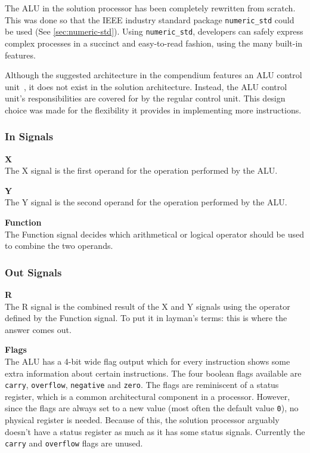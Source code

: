 The ALU in the solution processor has been completely rewritten from scratch.
This was done so that the IEEE industry standard package \texttt{numeric\_std} could be used (See \vref{sec:numeric-std}).
Using \texttt{numeric\_std}, developers can safely express complex processes in a succinct and easy-to-read fashion, using the many built-in features.

Although the suggested architecture in the compendium features an ALU control unit~\cite[p.115]{compendium}, it does not exist in the solution architecture.
Instead, the ALU control unit's responsibilities are covered for by the regular control unit.
This design choice was made for the flexibility it provides in implementing more instructions.

\subsubsection{In Signals}

\begin{description}
\item{\textbf{X}} \\
The X signal is the first operand for the operation performed by the ALU.

\item{\textbf{Y}} \\
The Y signal is the second operand for the operation performed by the ALU.

\item{\textbf{Function}} \\
The Function signal decides which arithmetical or logical operator should be used to combine the two operands.
\end{description}

\subsubsection{Out Signals}

\begin{description}
\item{\textbf{R}} \\
The R signal is the combined result of the X and Y signals using the operator defined by the Function signal.
To put it in layman's terms: this is where the answer comes out.

\item{\textbf{Flags}} \\
The ALU has a 4-bit wide flag output which for every instruction shows some extra information about certain instructions.
The four boolean flags available are \texttt{carry}, \texttt{overflow}, \texttt{negative} and \texttt{zero}.
The flags are reminiscent of a status register, which is a common architectural component in a processor.
However, since the flags are always set to a new value (most often the default value \texttt{0}), no physical register is needed.
Because of this, the solution processor arguably doesn't have a status register as much as it has some status signals.
Currently the \texttt{carry} and \texttt{overflow} flags are unused.

\end{description}
